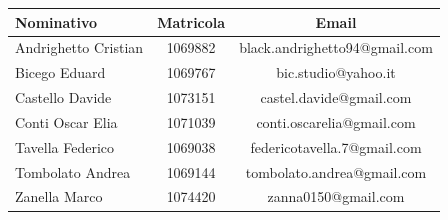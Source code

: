 \documentclass[PianoProgetto.tex]{subfiles}
\begin{document}
\begin{appendices}
\begin{table}[h]
		\begin{tabularx}{\textwidth}{lc C}
			\toprule
			\textbf{Nominativo} & \textbf{Matricola} & \textbf{Email} \\
			\midrule
			Andrighetto Cristian & 1069882 & black.andrighetto94@gmail.com \\
			Bicego Eduard & 1069767 & bic.studio@yahoo.it  \\
			Castello Davide	& 1073151 &	 castel.davide@gmail.com\\
			Conti Oscar Elia & 1071039 & conti.oscarelia@gmail.com \\
			Tavella Federico & 1069038 & federicotavella.7@gmail.com\\
			Tombolato Andrea & 1069144 & tombolato.andrea@gmail.com	 \\
			Zanella Marco & 1074420 & zanna0150@gmail.com \\
			\bottomrule
		\end{tabularx}
		
		\end{table}		
			
\end{appendices}
\end{document}
